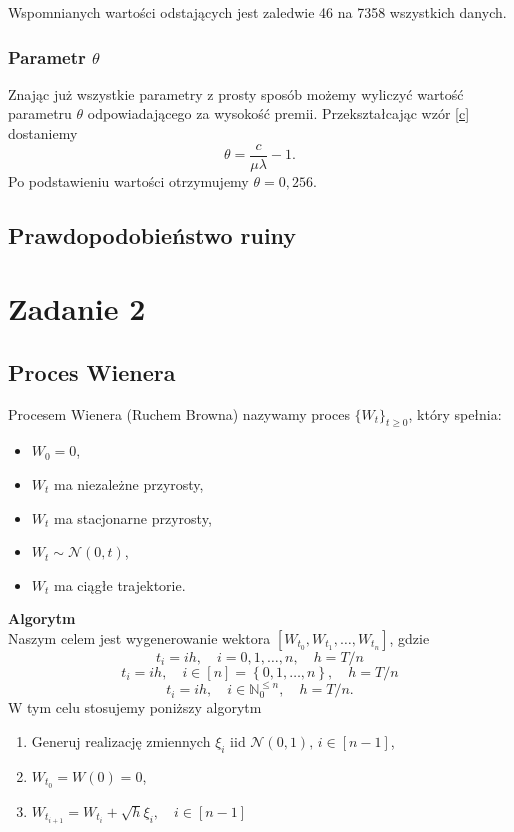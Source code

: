 \documentclass[12pt]{mwart}
\begin{document}
	\noindent Wspomnianych wartości odstających jest zaledwie 46 na 7358 wszystkich danych. 


	
	\subsubsection{Parametr {\boldmath $\theta$}}
	\noindent Znając już wszystkie parametry z prosty sposób możemy wyliczyć wartość parametru $\theta$ odpowiadającego za wysokość premii. Przekształcając wzór \eqref{c} dostaniemy
	$$ \theta = \frac{c}{\mu\lambda} - 1. $$
	Po podstawieniu wartości otrzymujemy $\theta = 0,256$.
	
	
	
	\subsection{Prawdopodobieństwo ruiny}
	
	
	
	
	\section{Zadanie 2}
	\subsection{Proces Wienera}
	\noindent Procesem Wienera (Ruchem Browna) nazywamy proces $\{W_t\}_{t\geqslant0}$, który spełnia:
	\begin{itemize}[leftmargin=10mm]%
		\item $W_0=0$,
		\item $W_t$ ma niezależne przyrosty,
		\item $W_t$ ma stacjonarne przyrosty,
		\item $W_t \sim \mathcal{N}(0, t)$,
		\item $W_t$ ma ciągłe trajektorie.
	\end{itemize}	
	\noindent \textbf{Algorytm}\\
	\noindent Naszym celem jest wygenerowanie wektora $\left[W_{t_0}, W_{t_1}, \dots, W_{t_n}\right]$, gdzie
	\begin{equation}
		t_i=ih, \quad i=0,1,\dots,n, \quad h=T/n
	\end{equation}
	\begin{equation}
		t_i=ih, \quad i\in\left[n\right]=\left\{0, 1, \dots, n\right\}, \quad h=T/n
	\end{equation}
	\begin{equation}
		t_i=ih, \quad i\in\mathbb{N}_0^{\leqslant n}, \quad h=T/n.
	\end{equation}
	W tym celu stosujemy poniższy algorytm
	\begin{enumerate}[leftmargin=10mm]
		\item Generuj realizację zmiennych $\xi_i\text{ iid }\mathcal{N}(0,1), \,i\in\left[n-1\right]$,
		\item $W_{t_0}=W\left(0\right)=0$,
		\item $W_{t_{i+1}} = W_{t_{i}}+\sqrt{h}\xi_i,\quad i\in\left[n-1\right]$%
	\end{enumerate}
\end{document}
